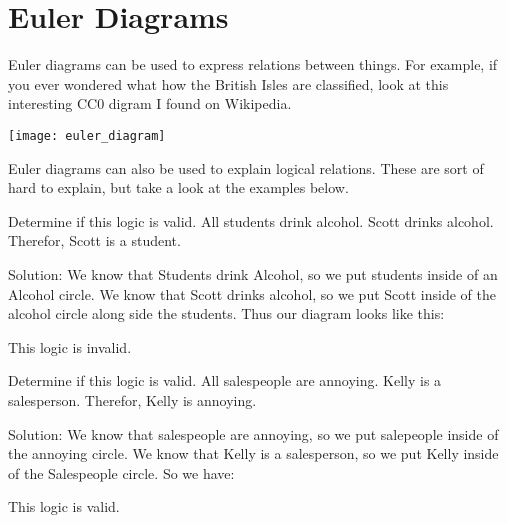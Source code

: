 \section{Euler Diagrams}

Euler diagrams can be used to express relations between things. For example, if you ever wondered what how the British Isles are classified, look at this interesting CC0 digram I found on Wikipedia.

\texttt{[image: euler\_diagram]}

Euler diagrams can also be used to explain logical relations. These are sort of hard to explain, but take a look at the examples below.

\begin{boxexample}{}{}
	Determine if this logic is valid. All students drink alcohol. Scott drinks alcohol. Therefor, Scott is a student.

	Solution: We know that Students drink Alcohol, so we put students inside of an Alcohol circle. We know that Scott drinks alcohol, so we put Scott inside of the alcohol circle along side the students. Thus our diagram looks like this: 


	This logic is invalid.
\end{boxexample}

\begin{boxexample}{}{}
	Determine if this logic is valid. All salespeople are annoying. Kelly is a salesperson. Therefor, Kelly is annoying.

	Solution: We know that salespeople are annoying, so we put salepeople inside of the annoying circle. We know that Kelly is a salesperson, so we put Kelly inside of the Salespeople circle. So we have:


	This logic is valid.
\end{boxexample}

